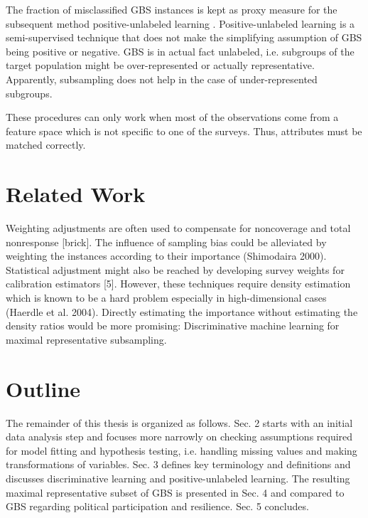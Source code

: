 The fraction of misclassified GBS instances is kept as proxy measure for the subsequent method positive-unlabeled learning \cite{denis1, denis2, elkan, calvo, claesen}. Positive-unlabeled learning is a semi-supervised technique that does not make the simplifying assumption of GBS being positive or negative. GBS is in actual fact unlabeled, i.e. subgroups of the target population might be over-represented or actually representative. Apparently, subsampling does not help in the case of under-represented subgroups.

These procedures can only work when most of the observations come from a feature space which is not specific to one of the surveys. Thus, attributes must be matched correctly. 

\section{Related Work}

Weighting adjustments are often used to compensate for noncoverage and total nonresponse [brick]. The influence of sampling bias could be alleviated by weighting the instances according to their importance (Shimodaira 2000). Statistical adjustment might also be reached by developing survey weights for calibration estimators [5]. However, these techniques require density estimation which is known to be a hard problem especially in high-dimensional cases (Haerdle et al. 2004). Directly estimating the importance without estimating the density ratios would be more promising: Discriminative machine learning for maximal representative subsampling.

\section{Outline}

The remainder of this thesis is organized as follows. Sec. 2 starts with an initial data analysis step and focuses more narrowly on checking assumptions required for model fitting and hypothesis testing, i.e. handling missing values and making transformations of variables. Sec. 3 defines key terminology and definitions and discusses discriminative learning and positive-unlabeled learning. The resulting maximal representative subset of GBS is presented in Sec. 4 and compared to GBS regarding political participation and resilience. Sec. 5 concludes.
